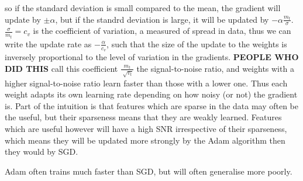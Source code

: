 so if the standard deviation is small compared to the mean, the gradient will update by $\pm \alpha$, but if the standrd deviation is large, it will be updated by $-\alpha \frac{m_t}{\sigma}$. $\frac{\sigma}{m_t} = c_v$ is the coefficient of variation, a measured of spread in data, thus we can write the update rate as $-\frac{\alpha}{c_v}$, such that the size of the update to the weights is inversely proportional to the level of variation in the gradients. \textbf{PEOPLE WHO DID THIS} call this coefficient $\frac{m_{t}}{\sqrt[]{v_{t}}}$ the signal-to-noise ratio, and weights with a higher signal-to-noise ratio learn faster than those with a lower one. Thus each weight adapts its own learning rate depending on how noisy (or not) the gradient is. Part of the intuition is that features which are sparse in the data may often be the useful, but their sparseness means that they are weakly learned. Features which are useful however will have a high SNR irrespective of their sparseness, which means they will be updated more strongly by the Adam algorithm then they would by SGD.

Adam often trains much faster than SGD, but will often generalise more poorly.  
